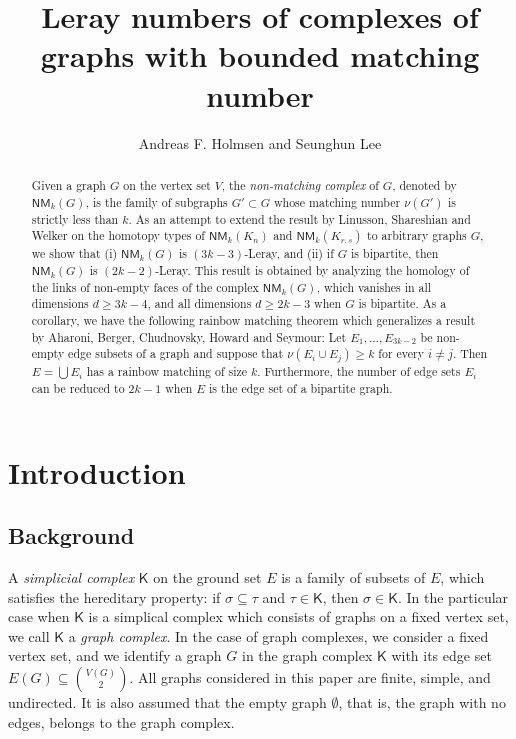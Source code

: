\documentclass[10pt]{amsart}
\title{Leray numbers of complexes of graphs with bounded matching number}
\author{Andreas F. Holmsen and Seunghun Lee}
\newcommand{\NM}{\mathsf{NM}}
\theoremstyle{definition}
\begin{document}
	\maketitle
	
	\begin{abstract}
		Given a graph $G$ on the vertex set $V$, the {\em non-matching complex} of $G$, denoted by $\NM_k(G)$, is the family of subgraphs $G' \subset G$ whose matching number $\nu(G')$ is strictly less than $k$. As an attempt to extend the result by Linusson, Shareshian and Welker on the homotopy types of $\NM_k(K_n)$ and $\NM_k(K_{r,s})$ to arbitrary graphs $G$, we show that (i) $\NM_k(G)$ is $(3k-3)$-Leray, and (ii) if $G$ is bipartite, then $\NM_k(G)$ is $(2k-2)$-Leray. This result is obtained by analyzing the homology of the links of non-empty faces of the complex $\NM_k(G)$, which vanishes in all dimensions $d\geq 3k-4$, and all dimensions $d \geq 2k-3$ when $G$ is bipartite. As a corollary, we have the following
		rainbow matching theorem which generalizes a result by Aharoni, Berger, Chudnovsky, Howard and Seymour: Let $E_1, \dots, E_{3k-2}$ be non-empty edge subsets of a graph and suppose that $\nu(E_i\cup E_j)\geq k$ for every $i\ne j$. Then $E=\bigcup E_i$ has a rainbow matching of size $k$. Furthermore, the number of edge sets $E_i$ can be reduced to $2k-1$ when $E$ is the edge set of a bipartite graph.
	\end{abstract}
	
	\section{Introduction}
	\subsection{Background}
	A \textit{simplicial complex} $\mathsf{K}$ on the ground set $E$ is a family of subsets of $E$, which satisfies the hereditary property: if $\sigma \subseteq \tau$ and $\tau \in \mathsf{K}$, then $\sigma \in \mathsf{K}$. In the particular case when $\mathsf{K}$ is a simplical complex which consists of graphs on a fixed vertex set, we call $\mathsf{K}$ a \textit{graph complex}. In the case of graph complexes, we consider a fixed vertex set, and we identify a graph $G$ in the graph complex $\mathsf{K}$ with its edge set $E(G) \subseteq \binom{V(G)}{2}$. All graphs considered in this paper are finite, simple, and undirected. It is also assumed that the empty graph $\emptyset$, that is, the graph with no edges, belongs to the graph complex.
	
\end{document}
